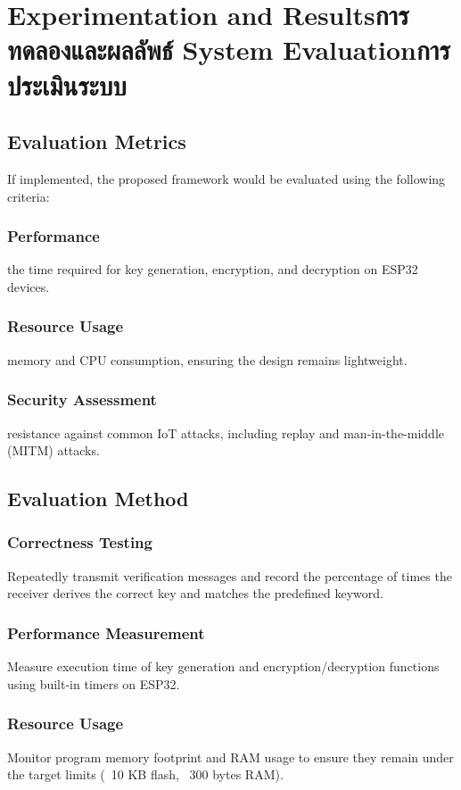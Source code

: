 \chapter{\ifproject%
\ifenglish Experimentation and Results\else การทดลองและผลลัพธ์\fi
\else%
\ifenglish System Evaluation\else การประเมินระบบ\fi
\fi}

\section{Evaluation Metrics}
If implemented, the proposed framework would be evaluated using the following criteria:

\subsection{Performance}
 the time required for key generation, encryption, and decryption on ESP32 devices.

\subsection{Resource Usage}
 memory and CPU consumption, ensuring the design remains lightweight.

\subsection{Security Assessment}
 resistance against common IoT attacks, including replay and man-in-the-middle (MITM) attacks.

 \section{Evaluation Method}

\subsection{Correctness Testing}
Repeatedly transmit verification messages and record the percentage of times the receiver derives the correct key and matches the predefined keyword.

\subsection{Performance Measurement}
Measure execution time of key generation and encryption/decryption functions using built-in timers on ESP32.

\subsection{Resource Usage}
Monitor program memory footprint and RAM usage to ensure they remain under the target limits (~10 KB flash, ~300 bytes RAM).

